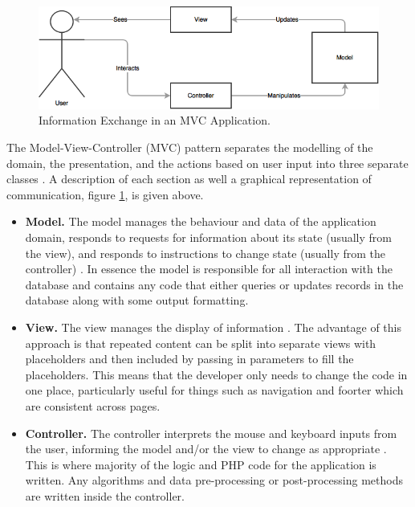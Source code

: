 \begin{figure}[H]
  \centering
  \includegraphics[width=1.0\textwidth]{Images/Technologies/MVC}
  \caption{Information Exchange in an MVC Application.} \label{fig:MVC} 
\end{figure}

The Model-View-Controller (MVC) pattern separates the modelling of the domain, the presentation, and the actions based on user input into three separate classes \cite{MSDN:MVC}. A description of each section as well a graphical representation of communication, figure \ref{fig:MVC}, is given above.

\begin{itemize}
	\item \textbf{Model.} The model manages the behaviour and data of the application domain, responds to requests for information about its state (usually from the view), and responds to instructions to change state (usually from the controller) \cite{MSDN:MVC}. In essence the model is responsible for all interaction with the database and contains any code that either queries or updates records in the database along with some output formatting.
	\item \textbf{View.} The view manages the display of information \cite{MSDN:MVC}. The advantage of this approach is that repeated content can be split into separate views with placeholders and then included by passing in parameters to fill the placeholders. This means that the developer only needs to change the code in one place, particularly useful for things such as navigation and foorter which are consistent across pages.
	\item \textbf{Controller.} The controller interprets the mouse and keyboard inputs from the user, informing the model and/or the view to change as appropriate \cite{MSDN:MVC}. This is where majority of the logic and PHP code for the application is written. Any algorithms and data pre-processing or post-processing methods are written inside the controller.
\end{itemize}

